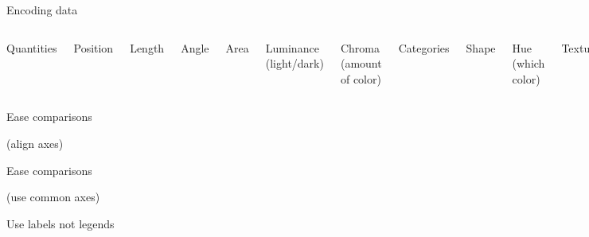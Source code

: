 \documentclass[aspectratio=169,12pt,t]{beamer}
\begin{document}
\begin{frame}{Encoding data}

\begin{columns}

{\hilit Quantities}

\bi
\item Position
\item Length
\item Angle
\item Area
\item Luminance {\lolit (light/dark)}
\item Chroma {\lolit (amount of color)}
\ei


{\hilit Categories}

\bi
\item Shape
\item Hue {\lolit (which color)}
\item Texture
\item Width
\ei

  \end{columns}

\note{
}
\end{frame}




\begin{frame}{Ease comparisons}

{\hilit (align axes)}


\note{
}
\end{frame}




\begin{frame}{Ease comparisons}

{\hilit (use common axes)}


\note{
}
\end{frame}







\begin{frame}[c]{Use labels not legends}


\note{
}
\end{frame}
\end{document}
